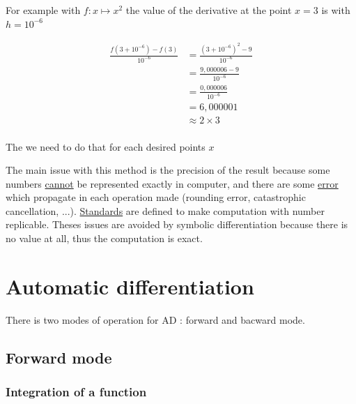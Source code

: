 \documentclass[12pt]{article}
\begin{document}
For example with $f: x \mapsto x^2$ the value of the derivative at the point $x=3$ is with $h=10^{-6}$

\begin{equation*}
    \begin{split}
        \frac{f(3+10^{-6})-f(3)}{10^{-6}} &= \frac{(3+10^{-6})^2 - 9}{10^{-6}}\\
            &= \frac{9,000006 - 9}{10^{-6}}\\
            &= \frac{0,000006}{10^{-6}}\\
            &= 6,000001 \\
            &\approx 2 \times 3 \\
    \end{split}
\end{equation*}

The we need to do that for each desired points $x$

The main issue with this method is the precision of the result because some numbers \href{https://math.stackexchange.com/questions/943589/how-many-numbers-can-a-typical-computer-represent}{cannot} be represented exactly in computer, and there are some \href{https://docs.oracle.com/cd/E19957-01/806-3568/ncg_goldberg.html}{error} which propagate in each operation made (rounding error, catastrophic cancellation, ...). \href{https://en.wikipedia.org/wiki/IEEE_754}{Standards} are defined to make computation with number replicable.
Theses issues are avoided by symbolic differentiation because there is no value at all, thus the computation is exact.


%
%

\section{Automatic differentiation}

There is two modes of operation for AD : forward and bacward mode.

\subsection{Forward mode}

\subsubsection{Integration of a function}
\end{document}
